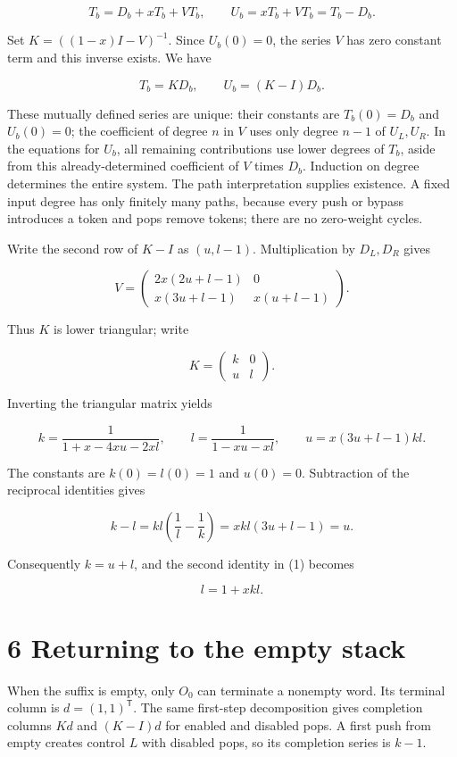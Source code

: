 \documentclass[11pt,letterpaper]{article}
\begin{document}
\[T_b=D_b+xT_b+VT_b,\qquad
U_b=xT_b+VT_b=T_b-D_b.\]

Set \(K=((1-x)I-V)^{-1}\). Since \(U_b(0)=0\), the series \(V\) has zero
constant term and this inverse exists. We have

\[T_b=KD_b,\qquad U_b=(K-I)D_b.\]

These mutually defined series are unique: their constants are
\(T_b(0)=D_b\) and \(U_b(0)=0\); the coefficient of degree \(n\) in
\(V\) uses only degree \(n-1\) of \(U_L,U_R\). In the equations for
\(U_b\), all remaining contributions use lower degrees of \(T_b\), aside
from this already-determined coefficient of \(V\) times \(D_b\).
Induction on degree determines the entire system. The path
interpretation supplies existence. A fixed input degree has only
finitely many paths, because every push or bypass introduces a token and
pops remove tokens; there are no zero-weight cycles.

Write the second row of \(K-I\) as \((u,l-1)\). Multiplication by
\(D_L,D_R\) gives

\[V=\begin{pmatrix}
2x(2u+l-1)&0\\
x(3u+l-1)&x(u+l-1)
\end{pmatrix}.\]

Thus \(K\) is lower triangular; write

\[K=\begin{pmatrix}k&0\\u&l\end{pmatrix}.\]

\begin{samepage}
Inverting the triangular matrix yields

\[k=\frac1{1+x-4xu-2xl},\qquad
l=\frac1{1-xu-xl},\qquad
u=x(3u+l-1)kl.\tag{1}\]
\end{samepage}

The constants are \(k(0)=l(0)=1\) and \(u(0)=0\). Subtraction of the
reciprocal identities gives

\[k-l=kl\left(\frac1l-\frac1k\right)
=xkl(3u+l-1)=u.\]

Consequently \(k=u+l\), and the second identity in (1) becomes

\[l=1+xkl.\tag{2}\]

\section{6 Returning to the empty
stack}\label{returning-to-the-empty-stack}

When the suffix is empty, only \(O_0\) can terminate a nonempty word.
Its terminal column is \(d=(1,1)^{\mathsf T}\). The same first-step
decomposition gives completion columns \(Kd\) and \((K-I)d\) for enabled
and disabled pops. A first push from empty creates control \(L\) with
disabled pops, so its completion series is \(k-1\).
\end{document}

